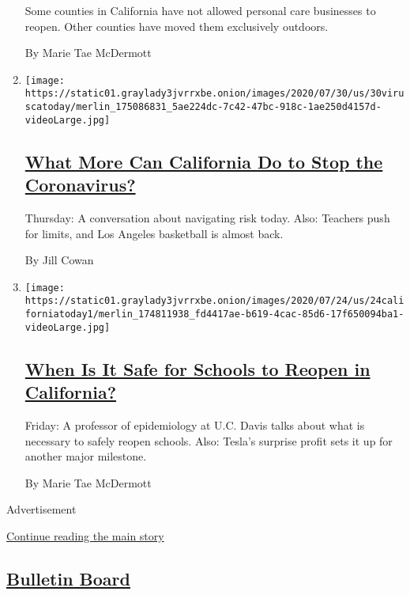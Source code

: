 \begin{enumerate}
  Some counties in California have not allowed personal care businesses
  to reopen. Other counties have moved them exclusively outdoors.

  By Marie Tae McDermott
\item
  \texttt{[image: https://static01.graylady3jvrrxbe.onion/images/2020/07/30/us/30viruscatoday/merlin\_175086831\_5ae224dc-7c42-47bc-918c-1ae250d4157d-videoLarge.jpg]}

  \hypertarget{what-more-can-california-do-to-stop-the-coronavirus}{%
  \subsection{\texorpdfstring{\href{/2020/07/30/us/coronavirus-california-health-equity.html}{What
  More Can California Do to Stop the
  Coronavirus?}}{What More Can California Do to Stop the Coronavirus?}}\label{what-more-can-california-do-to-stop-the-coronavirus}}

  Thursday: A conversation about navigating risk today. Also: Teachers
  push for limits, and Los Angeles basketball is almost back.

  By Jill Cowan
\item
  \texttt{[image: https://static01.graylady3jvrrxbe.onion/images/2020/07/24/us/24californiatoday1/merlin\_174811938\_fd4417ae-b619-4cac-85d6-17f650094ba1-videoLarge.jpg]}

  \hypertarget{when-is-it-safe-for-schools-to-reopen-in-california}{%
  \subsection{\texorpdfstring{\href{/2020/07/24/us/ca-schools-reopening.html}{When
  Is It Safe for Schools to Reopen in
  California?}}{When Is It Safe for Schools to Reopen in California?}}\label{when-is-it-safe-for-schools-to-reopen-in-california}}

  Friday: A professor of epidemiology at U.C. Davis talks about what is
  necessary to safely reopen schools. Also: Tesla's surprise profit sets
  it up for another major milestone.

  By Marie Tae McDermott
\end{enumerate}

Advertisement

\protect\hyperlink{after-mid2}{Continue reading the main story}

\hypertarget{bulletin-board}{%
\subsection{\texorpdfstring{\href{/series/bulletin-board}{Bulletin
Board}}{Bulletin Board}}\label{bulletin-board}}

